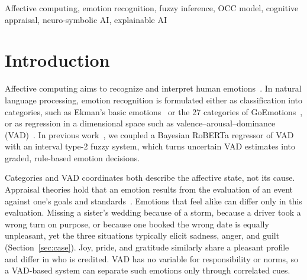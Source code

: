 \documentclass[conference, a4paper]{IEEEtran}
\begin{document}
\begin{IEEEkeywords}
Affective computing, emotion recognition, fuzzy inference, OCC model, cognitive appraisal, neuro-symbolic AI, explainable AI
\end{IEEEkeywords}

\section{Introduction}
\label{sec:intro}
Affective computing aims to recognize and interpret human emotions~\cite{picard1997affective}. In natural language processing, emotion recognition is formulated either as classification into categories, such as Ekman's basic emotions~\cite{ekman1992argument} or the 27 categories of GoEmotions~\cite{demszky2020goemotions}, or as regression in a dimensional space such as valence--arousal--dominance (VAD)~\cite{mehrabian1996pleasure,buechel2017emobank}. In previous work~\cite{bensaid_cat2nfi}, we coupled a Bayesian RoBERTa regressor of VAD with an interval type-2 fuzzy system, which turns uncertain VAD estimates into graded, rule-based emotion decisions.

Categories and VAD coordinates both describe the affective state, not its cause. Appraisal theories hold that an emotion results from the evaluation of an event against one's goals and standards~\cite{ortony1988cognitive,smith1985patterns}. Emotions that feel alike can differ only in this evaluation. Missing a sister's wedding because of a storm, because a driver took a wrong turn on purpose, or because one booked the wrong date is equally unpleasant, yet the three situations typically elicit sadness, anger, and guilt (Section~\ref{sec:case}). Joy, pride, and gratitude similarly share a pleasant profile and differ in who is credited. VAD has no variable for responsibility or norms, so a VAD-based system can separate such emotions only through correlated cues.
\end{document}
